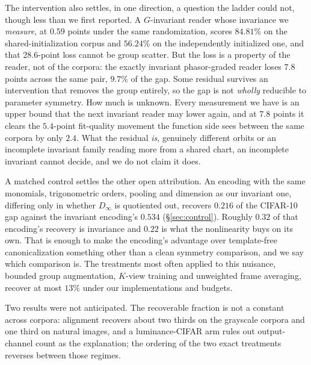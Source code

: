 \documentclass[10pt,twocolumn,letterpaper]{article}
\theoremstyle{definition}
\newcommand{\Dinf}{D_\infty}
\begin{document}
The intervention also settles, in one direction, a question the ladder could not, though less than we first reported. A $G$-invariant reader whose invariance we \emph{measure}, at $0.59$ points under the same randomization, scores $84.81\%$ on the shared-initialization
corpus and $56.24\%$ on the independently initialized one, and that $28.6$-point loss cannot be
group scatter. But the loss is a property of the reader, not of the corpora: the exactly invariant
phasor-graded reader loses $7.8$ points across the same pair, $9.7\%$ of the gap. Some residual survives an intervention that removes the group entirely, so the gap is not \emph{wholly} reducible to parameter symmetry. How much is unknown. Every measurement we have is an upper bound that the next invariant reader may lower again, and at $7.8$ points it clears the $5.4$-point fit-quality movement the function side sees between the same corpora by only $2.4$. What the residual \emph{is}, genuinely different orbits or an incomplete invariant family reading more from a shared chart, an incomplete invariant cannot decide, and we do not claim it does.

A matched control settles the other open attribution. An encoding with the same monomials, trigonometric orders, pooling and dimension as our invariant one, differing only in whether $\Dinf$ is quotiented out, recovers $0.216$ of the CIFAR-10 gap against the invariant encoding's $0.534$
(\S\ref{sec:control}). Roughly $0.32$ of that encoding's recovery is invariance and $0.22$ is what the nonlinearity buys on its own. That is enough to make the encoding's advantage over template-free canonicalization something other than a clean symmetry comparison, and we say which comparison is.
The treatments most often applied to this nuisance, bounded group augmentation, $K$-view training and unweighted frame averaging, recover at most $13\%$ under our implementations and
budgets.

Two results were not anticipated. The recoverable fraction is not a constant across corpora:
alignment recovers about two thirds on the grayscale corpora and one third on natural images, and
a luminance-CIFAR arm rules out output-channel count as the explanation; the ordering of the two
exact treatments reverses between those regimes.
\end{document}
